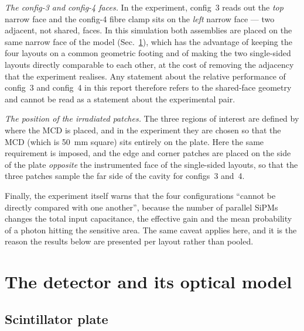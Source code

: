 \documentclass[11pt,a4paper]{article}
\begin{document}
\emph{The config-3 and config-4 faces.} In the experiment, config~3 reads out
the \emph{top} narrow face and the config-4 fibre clamp sits on the
\emph{left} narrow face --- two adjacent, not shared, faces. In this
simulation both assemblies are placed on the same narrow face of the model
(Sec.~\ref{sec:detector}), which has the advantage of keeping the four
layouts on a common geometric footing and of making the two single-sided
layouts directly comparable to each other, at the cost of removing the
adjacency that the experiment realises. Any statement about the relative
performance of config~3 and config~4 in this report therefore refers to the
shared-face geometry and cannot be read as a statement about the
experimental pair.

\emph{The position of the irradiated patches.} The three regions of interest
are defined by where the MCD is placed, and in the experiment they are
chosen so that the MCD (which is \SI{50}{\milli\meter} square) sits entirely
on the plate. Here the same requirement is imposed, and the edge and corner
patches are placed on the side of the plate \emph{opposite} the instrumented
face of the single-sided layouts, so that the three patches sample the far
side of the cavity for configs~3 and~4.

Finally, the experiment itself warns that the four configurations
``cannot be directly compared with one another'', because the number of
parallel SiPMs changes the total input capacitance, the effective gain and
the mean probability of a photon hitting the sensitive area. The same
caveat applies here, and it is the reason the results below are presented
per layout rather than pooled.

\section{The detector and its optical model}
\label{sec:detector}

\subsection{Scintillator plate}
\end{document}
